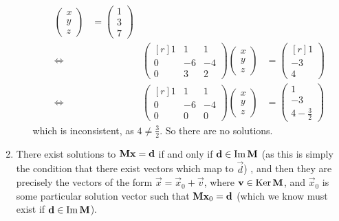 \documentclass[fleqn,a4paper,11pt]{article}
\begin{document}
\begin{enumerate}[label=\textbf{\arabic*.}]
\begin{itemize}
\begin{alignat*}
      \begin{pmatrix} x \\ y \\ z \end{pmatrix}
       &= \begin{pmatrix} 1 \\ 3 \\ 7 \end{pmatrix} \\
      \iff{}&&\begin{pmatrix*}[r]
       1 & 1 & 1 \\
       0 & -6 & -4 \\
       0 & 3 & 2
      \end{pmatrix*}
      \begin{pmatrix} x \\ y \\ z \end{pmatrix}
       &= \begin{pmatrix*}[r] 1 \\ -3 \\ 4 \end{pmatrix*} \\
      \iff{}&&\begin{pmatrix*}[r]
       1 & 1 & 1 \\
       0 & -6 & -4 \\
       0 & 0 & 0
      \end{pmatrix*}
      \begin{pmatrix} x \\ y \\ z \end{pmatrix}
       &= \begin{pmatrix} 1 \\ -3 \\ 4 - \tfrac 32 \end{pmatrix}
     \end{alignat*}
     which is inconsistent, as \(4 \ne \tfrac 32\). So there are no solutions.
   \end{itemize}
  \item
   There exist solutions to \(\mathbf{M} \mathrm{\mathbf{x}} = \mathrm{\mathbf{d}}\) if and only if
   \(\mathrm{\mathbf{d}} \in \operatorname{Im} \mathbf{M}\) (as this is simply the condition that there exist
   vectors which map to \(\vec d\)) , and then they are precisely the vectors of
   the form \(\vec x = \vec x_0 + \vec v\), where \(\mathrm{\mathbf{v}} \in \operatorname{Ker} \mathbf{M}\),
   and \(\vec x_0\) is some particular solution vector such that
   \(\mathbf{M} \mathrm{\mathbf{x}}_0 = \mathrm{\mathbf{d}}\)
   (which we know must exist if \(\mathrm{\mathbf{d}} \in \operatorname{Im} \mathbf{M}\)).


\end{enumerate}
\end{document}
